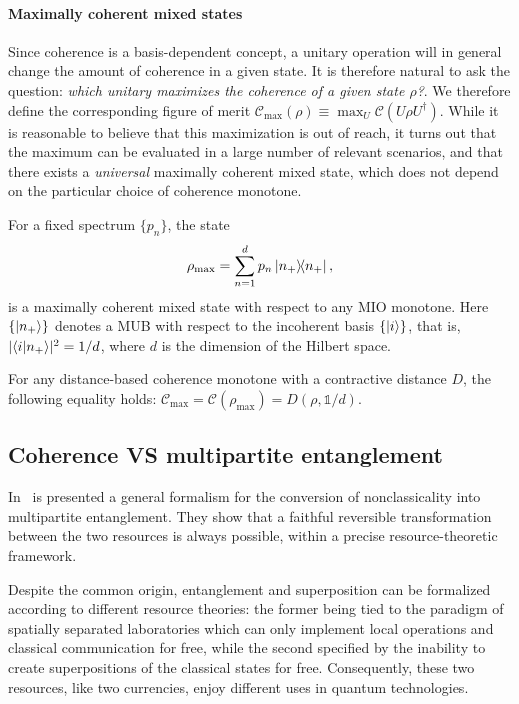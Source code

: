 \documentclass[a4paper]{report}
\newcommand{\on}[1]{\operatorname{#1}}
\begin{document}
\paragraph{Maximally coherent mixed states~\cite{streltsov2016maximal}}
Since coherence is a basis-dependent concept, a unitary operation will in general change the amount of coherence in a given state.
It is therefore natural to ask the question: \emph{which unitary maximizes the coherence of a given state $\rho$?}.
We therefore define the corresponding figure of merit
$\mathcal C_{\on{max}}(\rho) \equiv \max_U \mathcal C(U\rho U^\dagger)$.
While it is reasonable to believe that this maximization is out of reach, it turns out that the maximum can be evaluated in a large number of relevant scenarios, and that there exists a \emph{universal} maximally coherent mixed state, which does not depend on the particular choice of coherence monotone.
\begin{thm}
	For a fixed spectrum $\{ p_n \}$, the state
	\begin{equation}
		\rho_{\on{max}} = \sum_{n=1}^d p_n \ketbra{n_+},
	\end{equation}
	is a maximally coherent mixed state with respect to any \ac{MIO} monotone.
	Here $\{ \ket{n_+} \}$ denotes a \ac{MUB} with respect to the incoherent basis $\{ \ket{i} \}$,
	that is, $\lvert \braket{i}{n_+}\rvert^2 = 1/d$, where $d$ is the dimension of the Hilbert space.
\end{thm}
\begin{thm}
	For any distance-based coherence monotone with a contractive distance $D$,
	the following equality holds:
	$\mathcal C_{\on{max}} = \mathcal C(\rho_{\on{max}}) = D(\rho, \mathds{1} / d)$.
\end{thm}

\subsection{Coherence VS multipartite entanglement}
\parencite{regula2017converting,killoran2016converting}

In~\cite{regula2017converting} is presented a general formalism for the conversion of nonclassicality into multipartite entanglement.
They show that a faithful reversible transformation between the two resources is always possible, within a precise resource-theoretic framework.

Despite the common origin, entanglement and superposition can be formalized according to different resource theories:
the former being tied to the paradigm of spatially separated laboratories which can only implement local operations and classical communication for free,
while the second specified by the inability to create superpositions of the classical states for free.
Consequently, these two resources, like two currencies, enjoy different uses in quantum technologies.
\end{document}
